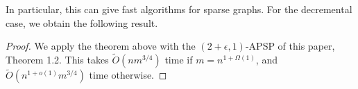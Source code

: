 In particular, this can give fast algorithms for sparse graphs.
For the decremental case, we obtain the following result. 
\thmtwoUnw*
\begin{proof}
    We apply the theorem above with the $(2+\epsilon,1)$-APSP of this paper, Theorem 1.2. This takes $\tilde O( nm^{3/4})$ time if $m=n^{1+\Omega(1)}$, and $\tilde O( n^{1+o(1)}m^{3/4})$ time otherwise.
\end{proof}


